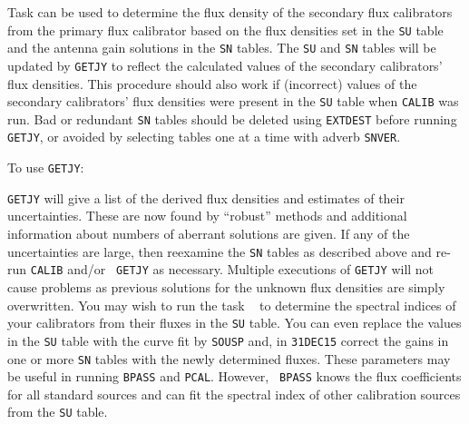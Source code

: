 
      Task {\tt {}} can be used to determine the flux
density of the secondary flux calibrators from the primary flux
calibrator based on the flux densities set in the {\tt SU} table and
the antenna gain solutions in the {\tt SN} tables.  The {\tt SU} and
{\tt SN} tables will be updated by {\tt GETJY} to reflect the
calculated values of the secondary calibrators' flux densities.  This
procedure should also work if (incorrect) values of the secondary
calibrators' flux densities were present in the {\tt SU} table when
{\tt CALIB} was run. Bad or redundant {\tt SN} tables should be
deleted using {\tt EXTDEST} before running {\tt GETJY}, or avoided by
selecting tables one at a time with adverb \hbox{{\tt SNVER}}.

      To use {\tt GETJY}:

      {\tt GETJY} will give a list of the derived flux densities and
estimates of their uncertainties.  These are now found by ``robust''
methods and additional information about numbers of aberrant solutions
are given.  If any of the uncertainties are large, then reexamine the
{\tt SN} tables as described above and re-run {\tt CALIB} and/or {\tt
GETJY} as necessary.  Multiple executions of {\tt GETJY} will not
cause problems as previous solutions for the unknown flux densities
are simply overwritten.  You may wish to run the task {\tt
{}} to determine the spectral indices of your calibrators
from their fluxes in the {\tt SU} table.  You can even replace the
values in the {\tt SU} table with the curve fit by {\tt SOUSP} and, in
{\tt 31DEC15} correct the gains in one or more {\tt SN} tables with
the newly determined fluxes.  These  parameters
may be useful in running {\tt BPASS} and {\tt PCAL}\@.  However, {\tt
BPASS} knows the flux coefficients for all standard 
sources and can fit the spectral index of other calibration sources
from the {\tt SU} table.

